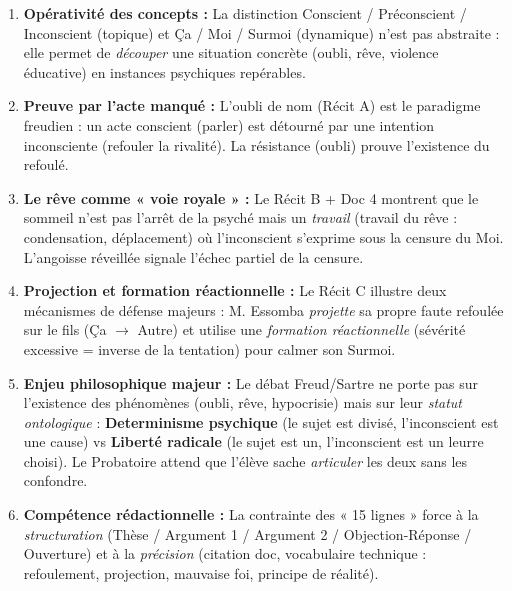 \documentclass[11pt]{article}
\newcommand{\cle}[1]{{\popxbold\color{popdark}#1}}
\newcounter{popsec}
\newcounter{popsub}
\newcommand{\courssub}[1]{%
  \stepcounter{popsub}%
  \par\vspace{9pt}\noindent{\popxbold\fontsize{11.5}{13}\selectfont\color{popink}{\color{poporange}\thepopsec.\thepopsub}\hspace{6pt}#1}\par\nopagebreak\vspace{4pt}
}
\begin{document}
\courssub{Bilan de l'activité}
\begin{aretenir}
\begin{enumerate}
    \item \textbf{Opérativité des concepts :} La distinction \cle{Conscient / Préconscient / Inconscient} (topique) et \cle{Ça / Moi / Surmoi} (dynamique) n'est pas abstraite : elle permet de \emph{découper} une situation concrète (oubli, rêve, violence éducative) en instances psychiques repérables.
    \item \textbf{Preuve par l'acte manqué :} L'oubli de nom (Récit A) est le paradigme freudien : un acte conscient (parler) est détourné par une intention inconsciente (refouler la rivalité). La \cle{résistance} (oubli) prouve l'existence du refoulé.
    \item \textbf{Le rêve comme « voie royale » :} Le Récit B + Doc 4 montrent que le sommeil n'est pas l'arrêt de la psyché mais un \emph{travail} (travail du rêve : condensation, déplacement) où l'inconscient s'exprime sous la censure du Moi. L'angoisse réveillée signale l'échec partiel de la censure.
    \item \textbf{Projection et formation réactionnelle :} Le Récit C illustre deux mécanismes de défense majeurs : M. Essomba \emph{projette} sa propre faute refoulée sur le fils (Ça $\rightarrow$ Autre) et utilise une \emph{formation réactionnelle} (sévérité excessive = inverse de la tentation) pour calmer son Surmoi.
    \item \textbf{Enjeu philosophique majeur :} Le débat Freud/Sartre ne porte pas sur l'existence des phénomènes (oubli, rêve, hypocrisie) mais sur leur \emph{statut ontologique} : \textbf{Determinisme psychique} (le sujet est divisé, l'inconscient est une cause) vs \textbf{Liberté radicale} (le sujet est un, l'inconscient est un leurre choisi). Le Probatoire attend que l'élève sache \emph{articuler} les deux sans les confondre.
    \item \textbf{Compétence rédactionnelle :} La contrainte des « 15 lignes » force à la \emph{structuration} (Thèse / Argument 1 / Argument 2 / Objection-Réponse / Ouverture) et à la \emph{précision} (citation doc, vocabulaire technique : refoulement, projection, mauvaise foi, principe de réalité).
\end{enumerate}
\end{aretenir}
\end{document}
